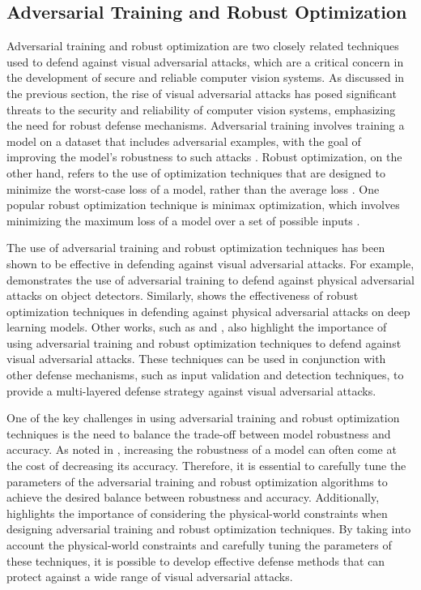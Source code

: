 \documentclass[11pt,a4paper]{article}
\begin{document}
\subsection{Adversarial Training and Robust Optimization}


Adversarial training and robust optimization are two closely related techniques used to defend against visual adversarial attacks, which are a critical concern in the development of secure and reliable computer vision systems. As discussed in the previous section, the rise of visual adversarial attacks has posed significant threats to the security and reliability of computer vision systems, emphasizing the need for robust defense mechanisms. Adversarial training involves training a model on a dataset that includes adversarial examples, with the goal of improving the model's robustness to such attacks \cite{arxiv:1810.00069}. Robust optimization, on the other hand, refers to the use of optimization techniques that are designed to minimize the worst-case loss of a model, rather than the average loss \cite{arxiv:1707.08945}. One popular robust optimization technique is minimax optimization, which involves minimizing the maximum loss of a model over a set of possible inputs \cite{doi:10.1201/9781351251389-8}.

The use of adversarial training and robust optimization techniques has been shown to be effective in defending against visual adversarial attacks. For example, \cite{arxiv:1707.07397} demonstrates the use of adversarial training to defend against physical adversarial attacks on object detectors. Similarly, \cite{arxiv:1707.08945} shows the effectiveness of robust optimization techniques in defending against physical adversarial attacks on deep learning models. Other works, such as \cite{doi:10.1126/science.aaw4399} and \cite{arxiv:1810.00069}, also highlight the importance of using adversarial training and robust optimization techniques to defend against visual adversarial attacks. These techniques can be used in conjunction with other defense mechanisms, such as input validation and detection techniques, to provide a multi-layered defense strategy against visual adversarial attacks.

One of the key challenges in using adversarial training and robust optimization techniques is the need to balance the trade-off between model robustness and accuracy. As noted in \cite{doi:10.1049/cit2.12028}, increasing the robustness of a model can often come at the cost of decreasing its accuracy. Therefore, it is essential to carefully tune the parameters of the adversarial training and robust optimization algorithms to achieve the desired balance between robustness and accuracy. Additionally, \cite{doi:10.1109/cvpr42600.2020.00108} highlights the importance of considering the physical-world constraints when designing adversarial training and robust optimization techniques. By taking into account the physical-world constraints and carefully tuning the parameters of these techniques, it is possible to develop effective defense methods that can protect against a wide range of visual adversarial attacks.
\end{document}
